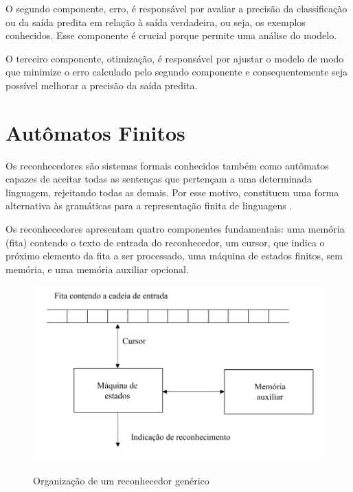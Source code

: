 O segundo componente, erro, é responsável por avaliar a precisão da classificação ou da saída predita em relação à saída verdadeira, ou seja, os exemplos conhecidos. Esse componente é crucial porque permite uma análise do modelo.


O terceiro componente, otimização, é responsável por ajustar o modelo de modo que  minimize o  erro calculado pelo segundo componente e consequentemente seja possível melhorar a precisão da saída predita. 



\section[Autômatos Finitos]{Autômatos Finitos}


Os reconhecedores são sistemas formais conhecidos também como autômatos capazes de aceitar todas as sentenças que pertençam a uma determinada linguagem, rejeitando todas as demais. Por esse motivo, constituem uma forma alternativa às gramáticas para a representação finita de linguagens \cite{fundamentosComputacao}.

Os reconhecedores apresentam quatro componentes fundamentais: uma memória (fita) contendo o texto de entrada do
reconhecedor, um cursor, que indica o próximo elemento da fita a ser processado, uma máquina de estados finitos, sem memória, e uma memória auxiliar opcional.


\begin{figure}[H]
	\centering
    \caption{Organização de um reconhecedor genérico}
	\includegraphics[scale=2]{figuras/AFD/reconhecedor.png}
	\label{fig:Organizacao de um reconhecedor generico}
\end{figure}


